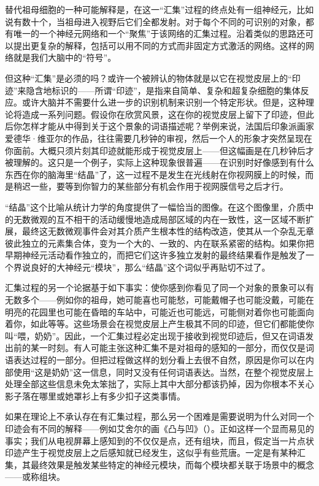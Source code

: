 替代祖母细胞的一种可能解释是，在这一“汇集”过程的终点处有一组神经元，比如说有数十个，当祖母进入视野后它们全都发射。对于每个不同的可识别的对象，都有唯一的一个神经元网络和一个“聚焦”于该网络的汇集过程。沿着类似的思路还可以提出更复杂的解释，包括可以用不同的方式而非固定方式激活的网络。这样的网络就是我们大脑中的“符号”。

但这种“汇集”是必须的吗？或许一个被辨认的物体就是以它在视觉皮层上的“印迹”来隐含地标识的——所谓“印迹”，是指来自简单、复杂和超复杂细胞的集体反应。或许大脑并不需要什么进一步的识别机制来识别一个特定形状。但是，这种理论将造成一系列问题。假设你在欣赏风景，这在你的视觉皮层上留下了印迹，但此后你怎样才能从中得到关于这个景象的词语描述呢？举例来说，法国后印象派画家爱德华·维亚尔的作品，往往需要几秒钟的审视，然后一个人的形象才突然呈现在你面前。大概只须片刻其印迹就能形成于视觉皮层上——但这幅画是在几秒钟后才被理解的。这只是一个例子，实际上这种现象很普遍——在识别时好像感到有什么东西在你的脑海里“结晶”了，这一过程不是发生在光线射在你视网膜上的时候，而是稍迟一些，要等到你智力的某些部分有机会作用于视网膜信号之后才行。

“结晶”这个比喻从统计力学的角度提供了一幅恰当的图像。在这个图像里，介质中的无数微观的互不相干的活动缓慢地造成局部区域的内在一致性，这一区域不断扩展，最终这无数微观事件会对其介质产生根本性的结构改造，使其从一个杂乱无章彼此独立的元素集合体，变为一个大的、一致的、内在联系紧密的结构。如果你把早期神经元活动看作独立的，而把它们这许多独立发射的最终结果看作是触发了一个界说良好的大神经元“模块”，那么“结晶”这个词似乎再贴切不过了。

汇集过程的另一个论据基于如下事实：使你感到你看见了同一个对象的景象可以有无数多个——例如你的祖母，她可能喜也可能愁，可能戴帽子也可能没戴，可能在明亮的花园里也可能在昏暗的车站中，可能近也可能远，可能侧对着你也可能面向着你，如此等等。这些场景会在视觉皮层上产生极其不同的印迹，但它们都能使你叫“喂，奶奶”。因此，一个汇集过程必定出现于接收到视觉印迹后，但又在词语发出前的某一时刻。有人可能主张这种汇集不是对祖母的感知的一部分，而仅仅是词语表达过程的一部分。但把过程做这样的划分看上去很不自然，原因是你可以在内部使用“这是奶奶”这一信息，同时又没有任何词语表达。当然，在整个视觉皮层上处理全部这些信息未免太笨拙了，实际上其中大部分都该扔掉，因为你根本不关心影子落在哪里或她罩衫上有多少扣子这类事情。

如果在理论上不承认存在有汇集过程，那么另一个困难是需要说明为什么对同一个印迹会有不同的解释——例如艾舍尔的画《凸与凹》（）。正如这样一个显而易见的事实；我们从电视屏幕上感知到的不仅仅是点，还有组块，而且，假定当一片点状印迹产生于视觉皮层上之后感知就已经发生，这似乎有些荒唐。一定是有某种汇集，其最终效果是触发某些特定的神经元模块，而每个模块都关联于场景中的概念——或称组块。

